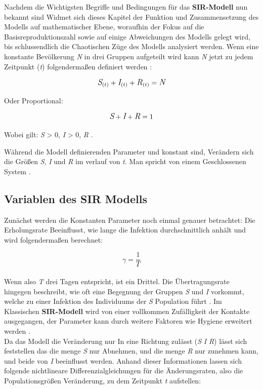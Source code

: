 \documentclass[12pt]{scrartcl} %
\begin{document}
Nachdem die Wichtigsten Begriffe und Bedingungen für das \textbf{SIR-Modell} nun bekannt sind Widmet sich dieses Kapitel der Funktion und Zusammensetzung des Modells auf mathematischer Ebene, woraufhin der Fokus auf die Basisreproduktionszahl sowie auf einige Abweichungen des Modells gelegt wird, bis schlussendlich die Chaotischen Züge des Modells analysiert werden.
Wenn eine konstante Bevölkerung \textit{N} in drei Gruppen aufgeteilt wird kann \textit{N} jetzt zu jedem Zeitpunkt (\textit{t}) folgendermaßen definiert werden \cite{3,4}:

$$ \large\textit{S}_{(t)} + \textit{I}_{(t)} + \textit{R}_{(t)} = \textit{N}\normalsize $$

Oder Proportional:

$$ \large\textit{S} + \textit{I} + \textit{R} = 1 $$
\begin{center}
Wobei gilt: \textit{S} > 0, \textit{I} > 0, \textit{R} .
\end{center}

Während die Modell definierenden Parameter \textbeta\space und \textgamma\space konstant sind, Verändern sich die Größen \textit{S}, \textit{I} und \textit{R} im verlauf von \textit{t}. Man spricht von einem Geschlossenen System \cite{4}.


\subsection{Variablen des SIR Modells}

Zunächst werden die Konstanten Parameter noch einmal genauer betrachtet: Die Erholungsrate \textgamma\space Beeinflusst, wie lange die Infektion durchschnittlich anhält und wird folgendermaßen berechnet:

$$ \gamma = \frac{1}{T} $$
\\

Wenn also \textit{T} drei Tagen entspricht, ist \textgamma\space ein Drittel. Die Übertragungsrate \textbeta\space hingegen beschreibt, wie oft eine Begegnung der Gruppen \textit{S} und \textit{I} vorkommt, welche zu einer Infektion des Individuums der \textit{S} Population führt \cite{2}. 
Im Klassischen \textbf{SIR-Modell} wird von einer vollkommen Zufälligkeit der Kontakte ausgegangen, der Parameter kann durch weitere Faktoren wie Hygiene erweitert werden \cite{2,7}.\\
Da das Modell die Veränderung nur In eine Richtung zulässt (\textit{S} \textrightarrow\space \textit{I} \textrightarrow\space \textit{R}) lässt sich feststellen das die menge \textit{S} nur Abnehmen, und die menge \textit{R} nur zunehmen kann, und beide von \textit{I} beeinflusst werden.
Anhand dieser Informationen lassen sich folgende nichtlineare Differenzialgleichungen für die Änderungsraten, also die Populationsgrößen Veränderung, zu dem Zeitpunkt \textit{t} aufstellen:
\end{document}
